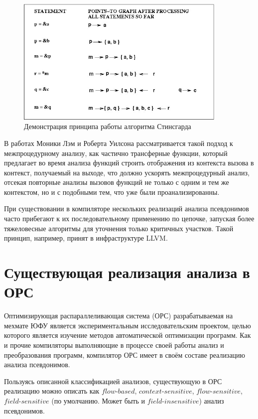 \begin{figure}[H]
\centering
\includegraphics[width=0.9\textwidth]{img/steensgaard.jpg}
\caption{Демонстрация принципа работы алгоритма Стинсгарда}
\label{fig:steensgaard}
\end{figure}

В работах Моники Лэм и Роберта Уилсона рассматривается такой подход к межпроцедурному анализу, как частично трансферные функции, который предлагает во время анализа функций строить отображения из контекста вызова в контекст, получаемый на выходе, что должно ускорять межпроцедурный анализ, отсекая повторные анализы вызовов функций не только с одним и тем же контекстом, но и с подобными тем, что уже были проанализированны.

При существовании в компиляторе нескольких реализаций анализа псевдонимов часто прибегают к их последовательному применению по цепочке, запуская более тяжеловесные алгоритмы для уточнения только критичных участков. Такой принцип, например, принят в инфраструктуре LLVM.

\section{Существующая реализация анализа в ОРС}

Оптимизирующая распараллеливающая система (ОРС) разрабатываемая на мехмате ЮФУ является экспериментальным исследовательским проектом, целью которого является изучение методов автоматической оптимизации программ. Как и прочие компиляторы выполняющие в процессе своей работы анализ и преобразования программ, компилятор ОРС имеет в своём составе реализацию анализа псевдонимов.

Пользуясь описанной классификацией анализов, существующую в ОРС реализацию можно описать как $flow$-$based$, $context$-$sensitive$, $flow$-$sensitive$, $field$-$sensitive$ (по умолчанию. Может быть и $field$-$insensitive$) анализ псевдонимов.

